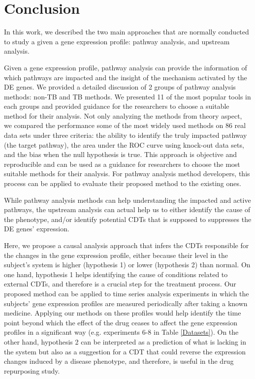 \section{Conclusion}

In this work, we described the two main approaches that are normally conducted to study a given a gene expression profile: pathway analysis, and upstream analysis.

Given a gene expression profile, pathway analysis can provide the information of which pathways are impacted and the insight of the mechanism activated by the DE genes. We provided a detailed discussion of 2 groups of pathway analysis methods: non-TB and TB methods. We presented 11 of the most popular tools in each groups and provided guidance for the researchers to choose a suitable method for their analysis. Not only analyzing the methods from theory aspect, we compared the performance some of the most widely used methods on 86 real data sets under three criteria: the ability to identify the truly impacted pathway (the target pathway), the area under the ROC curve using knock-out data sets, and the bias when the null hypothesis is true. This approach is objective and reproducible and can be used as a guidance for researchers to choose the most suitable methods for their analysis. For pathway analysis method developers, this process can be applied to evaluate their proposed method to the existing ones. 

While pathway analysis methods can help understanding the impacted and active pathways, the upstream analysis can actual help us to either identify the cause of the phenotype, and/or identify potential CDTs that is supposed to suppresses the DE genes' expression. 

Here, we propose a causal analysis approach that infers the CDTs responsible for the changes in the gene expression profile, either because their level in the subject's system is higher (hypothesis 1) or lower (hypothesis 2) than normal. 
On one hand,  hypothesis 1 helps identifying the cause of conditions related to external CDTs, and therefore is a crucial step for the treatment process. 
Our proposed method can be applied to time series analysis experiments in which the subjects' gene expression profiles are measured periodically after taking a known medicine. Applying our methods on these profiles would help identify the time point beyond which the effect of the drug ceases to affect the gene expression profiles in a significant way  (e.g. experiments 6-8 in Table \ref{Datasets}).
On the other hand, hypothesis 2 can be interpreted as a prediction of what is lacking in the system but also as a suggestion for a CDT that could reverse the expression changes induced by a disease phenotype, and therefore, is useful in the drug repurposing study. %




